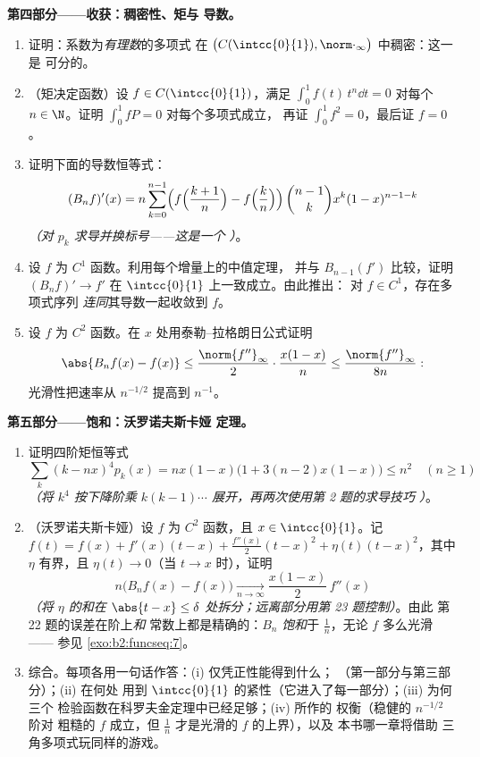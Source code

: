 \begin{problem}
\medskip
\noindent\textbf{第四部分——收获：稠密性、矩与
导数。}
\begin{enumerate}[resume]
  \item 证明：系数为\emph{有理数}的多项式
        在 $\bigl(C(\intcc{0}{1}),
        \norm\cdot_\infty\bigr)$ 中稠密：这一是
        可分的。
  \item （矩决定函数）设 $f \in
        C(\intcc{0}{1})$，满足 $\int_0^1 f(t)\,t^n \dd t = 0$
        对每个 $n \in \N$。证明 $\int_0^1 f P = 0$ 对每个多项式成立，
        再证 $\int_0^1 f^2 = 0$，最后证 $f = 0$。
  \item 证明下面的导数恒等式：
        \[
        (B_nf)'(x) = n\sum_{k=0}^{n-1}\Bigl(
        f\Bigl(\frac{k+1}{n}\Bigr) -
        f\Bigl(\frac kn\Bigr)\Bigr)\,
        \binom{n-1}{k}x^k(1-x)^{n-1-k}
        \]
        \emph{（对 $p_k$ 求导并换标号——这是一个
        ）}。
  \item 设 $f$ 为 $C^1$ 函数。利用每个增量上的中值定理，
        并与 $B_{n-1}(f')$ 比较，证明
        $(B_nf)' \to f'$ 在 $\intcc{0}{1}$ 上一致成立。由此推出：
        对 $f \in C^1$，存在多项式序列
        \emph{连同}其导数一起收敛到 $f$。
  \item 设 $f$ 为 $C^2$ 函数。在 $x$ 处用泰勒–拉格朗日公式证明
        \[
        \abs{B_nf(x) - f(x)} \leq
        \frac{\norm{f''}_\infty}{2}\cdot\frac{x(1-x)}{n}
        \leq \frac{\norm{f''}_\infty}{8n} :
        \]
        光滑性把速率从 $n^{-1/2}$ 提高到
        $n^{-1}$。
\end{enumerate}

\medskip
\noindent\textbf{第五部分——饱和：沃罗诺夫斯卡娅
定理。}
\begin{enumerate}[resume]
  \item 证明四阶矩恒等式
        \[
        \sum_k (k - nx)^4 p_k(x)
        = nx(1-x)\bigl(1 + 3(n-2)x(1-x)\bigr) \leq n^2
        \quad (n \geq 1)
        \]
        \emph{（将 $k^4$ 按下降阶乘 $k(k-1)\cdots$
        展开，再两次使用第 2 题的求导技巧
        ）}。
  \item （沃罗诺夫斯卡娅）设 $f$ 为 $C^2$ 函数，且 $x \in
        \intcc{0}{1}$。记 $f(t) = f(x) + f'(x)(t-x) +
        \frac{f''(x)}2(t-x)^2 + \eta(t)(t-x)^2$，其中 $\eta$
        有界，且 $\eta(t) \to 0$（当 $t \to x$ 时），证明
        \[
        n\bigl(B_nf(x) - f(x)\bigr)
        \xrightarrow[n\to\infty]{}
        \frac{x(1-x)}{2}\,f''(x)
        \]
        \emph{（将 $\eta$ 的和在 $\abs{t - x} \leq
        \delta$ 处拆分；远离部分用第 23 题控制）}。由此
        第 22 题的误差在阶上\emph{和}
        常数上都是精确的：$B_n$ \emph{饱和}于 $\frac1n$，无论
        $f$ 多么光滑 —— 参见
        \cref{exo:b2:funcseq:7}。
  \item 综合。每项各用一句话作答：(i) 仅凭正性能得到什么；
        （第一部分与第三部分）；(ii) 在何处
        用到 $\intcc{0}{1}$ 的紧性（它进入了每一部分）；(iii) 为何三个
        检验函数在科罗夫金定理中已经足够；(iv) 所作的
        权衡（稳健的 $n^{-1/2}$ 阶对
        粗糙的 $f$ 成立，但 $\frac1n$ 才是光滑的 $f$ 的上界），以及
        本书哪一章将借助
        三角多项式玩同样的游戏。
\end{enumerate}
\end{problem}
